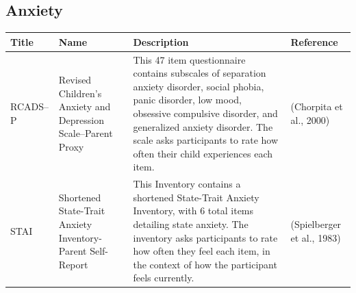 \documentclass[]{book}
\begin{document}
\hypertarget{anxiety}{%
\subsection{Anxiety}\label{anxiety}}

\begin{longtable}[]{@{}llll@{}}
\toprule
\begin{minipage}[b]{0.13\columnwidth}\raggedright
Title\strut
\end{minipage} & \begin{minipage}[b]{0.21\columnwidth}\raggedright
Name\strut
\end{minipage} & \begin{minipage}[b]{0.38\columnwidth}\raggedright
Description\strut
\end{minipage} & \begin{minipage}[b]{0.15\columnwidth}\raggedright
Reference\strut
\end{minipage}\tabularnewline
\midrule
\endhead
\begin{minipage}[t]{0.13\columnwidth}\raggedright
RCADS--P\strut
\end{minipage} & \begin{minipage}[t]{0.21\columnwidth}\raggedright
Revised Children's Anxiety and Depression Scale--Parent Proxy\strut
\end{minipage} & \begin{minipage}[t]{0.38\columnwidth}\raggedright
This 47 item questionnaire contains subscales of separation anxiety disorder, social phobia, panic disorder, low mood, obsessive compulsive disorder, and generalized anxiety disorder. The scale asks participants to rate how often their child experiences each item.\strut
\end{minipage} & \begin{minipage}[t]{0.15\columnwidth}\raggedright
(Chorpita et al., 2000)\strut
\end{minipage}\tabularnewline
\begin{minipage}[t]{0.13\columnwidth}\raggedright
STAI\strut
\end{minipage} & \begin{minipage}[t]{0.21\columnwidth}\raggedright
Shortened State-Trait Anxiety Inventory-Parent Self-Report\strut
\end{minipage} & \begin{minipage}[t]{0.38\columnwidth}\raggedright
This Inventory contains a shortened State-Trait Anxiety Inventory, with 6 total items detailing state anxiety. The inventory asks participants to rate how often they feel each item, in the context of how the participant feels currently.\strut
\end{minipage} & \begin{minipage}[t]{0.15\columnwidth}\raggedright
(Spielberger et al., 1983)\strut
\end{minipage}\tabularnewline
\bottomrule
\end{longtable}
\end{document}
